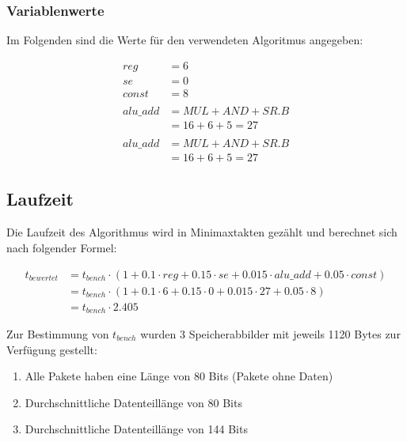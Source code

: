 \subsubsection{Variablenwerte}
\label{subsubsection:Dokumentation-BenchmarkBewertung-Berechnung-Variablen-Variablenwerte}


Im Folgenden sind die Werte für den verwendeten Algoritmus angegeben:

\begin{align*}
    reg      &= 6 \\
    se       &= 0 \\
    const    &= 8 \\ \\
    alu\_add &= MUL + AND + SR.B \\
             &= 16 + 6 + 5 = 27 \\ \\
    alu\_add &= MUL + AND + SR.B \\
             &= 16 + 6 + 5 = 27
\end{align*}

\subsection{Laufzeit}
\label{subsection:Dokumentation-BenchmarkBewertung-Berechnung-Laufzeit}

Die Laufzeit des Algorithmus wird in Minimaxtakten gezählt und berechnet sich nach folgender Formel:

\begin{align*}
    t_{bewertet} &= t_{bench} \cdot (1 + 0.1 \cdot reg + 0.15 \cdot se + 0.015 \cdot alu\_add + 0.05 \cdot const) \\
                 &= t_{bench} \cdot (1 + 0.1 \cdot 6 + 0.15 \cdot 0 + 0.015 \cdot 27 + 0.05 \cdot 8) \\
                 &= t_{bench} \cdot 2.405
\end{align*}

Zur Bestimmung von $t_{bench}$ wurden 3 Speicherabbilder mit jeweils 1120 Bytes zur Verfügung gestellt:

\begin{enumerate}
    \item Alle Pakete haben eine Länge von 80 Bits (Pakete ohne Daten)
    \item Durchschnittliche Datenteillänge von 80 Bits
    \item Durchschnittliche Datenteillänge von 144 Bits
\end{enumerate}

